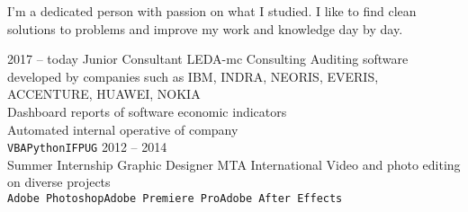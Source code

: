 \documentclass[9pt]{developercv} %
\begin{document}
\vspace{0.5cm}



\begin{minipage}[t]{0.4\textwidth} %
	\vspace{-\baselineskip} %
	
	I'm a dedicated person with passion on what I studied. I like to find clean solutions to problems and improve my work and knowledge day by day.
	
\end{minipage}
\hfill %
\begin{minipage}[t]{0.5\textwidth} %
	\vspace{-\baselineskip} %
	\begin{barchart}{5.5}
	\end{barchart}
\end{minipage}

\begin{minipage}[t]{0.4\textwidth}
	\vspace{-15mm} %
\end{minipage}



\begin{entrylist}
	\entry
		{2017 -- today}
		{Junior Consultant}
		{LEDA-mc Consulting}
		{Auditing software developed by companies such as IBM, INDRA, NEORIS, EVERIS, ACCENTURE, HUAWEI, NOKIA\\Dashboard reports of software economic indicators \\ Automated internal operative of company \\ \texttt{VBA}\slashsep\texttt{Python}\slashsep\texttt{IFPUG}}
	\entry
		{2012 -- 2014\\\footnotesize{Summer Internship}}
		{Graphic Designer}
		{MTA International}
		{Video and photo editing on diverse projects\\ \texttt{Adobe Photoshop}\slashsep\texttt{Adobe Premiere Pro}\slashsep\texttt{Adobe After Effects}}
\end{entrylist}
\end{document}
